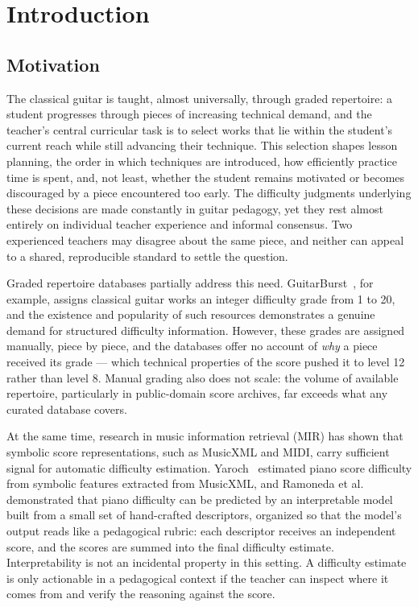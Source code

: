 \chapter{Introduction}
\label{ch:introduction}

\section{Motivation}
The classical guitar is taught, almost universally, through graded repertoire: a student progresses through pieces of increasing technical demand, and the teacher's central curricular task is to select works that lie within the student's current reach while still advancing their technique. This selection shapes lesson planning, the order in which techniques are introduced, how efficiently practice time is spent, and, not least, whether the student remains motivated or becomes discouraged by a piece encountered too early. The difficulty judgments underlying these decisions are made constantly in guitar pedagogy, yet they rest almost entirely on individual teacher experience and informal consensus. Two experienced teachers may disagree about the same piece, and neither can appeal to a shared, reproducible standard to settle the question.

Graded repertoire databases partially address this need. GuitarBurst~\cite{guitarburst}, for example, assigns classical guitar works an integer difficulty grade from 1 to 20, and the existence and popularity of such resources demonstrates a genuine demand for structured difficulty information. However, these grades are assigned manually, piece by piece, and the databases offer no account of \emph{why} a piece received its grade --- which technical properties of the score pushed it to level 12 rather than level 8. Manual grading also does not scale: the volume of available repertoire, particularly in public-domain score archives, far exceeds what any curated database covers.

At the same time, research in music information retrieval (MIR) has shown that symbolic score representations, such as MusicXML and MIDI, carry sufficient signal for automatic difficulty estimation. Yaroch~\cite{yaroch2025measure} estimated piano score difficulty from symbolic features extracted from MusicXML, and Ramoneda et al.~\cite{ramoneda2024rubricnet} demonstrated that piano difficulty can be predicted by an interpretable model built from a small set of hand-crafted descriptors, organized so that the model's output reads like a pedagogical rubric: each descriptor receives an independent score, and the scores are summed into the final difficulty estimate. Interpretability is not an incidental property in this setting. A difficulty estimate is only actionable in a pedagogical context if the teacher can inspect where it comes from and verify the reasoning against the score.

